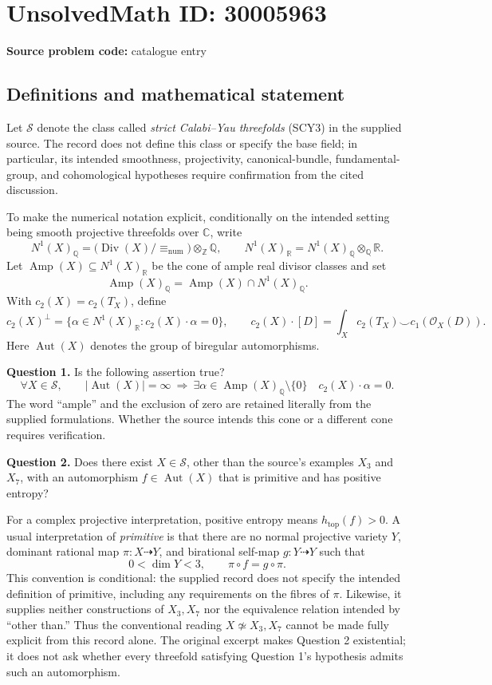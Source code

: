 \documentclass[11pt]{article}
\newcommand{\Z}{\mathbb{Z}}
\newcommand{\Q}{\mathbb{Q}}
\newcommand{\R}{\mathbb{R}}
\newcommand{\C}{\mathbb{C}}
\begin{document}
\section*{UnsolvedMath ID: 30005963}
\textbf{Source problem code:} catalogue entry
\subsection{Definitions and mathematical statement}
Let \(\mathcal S\) denote the class called \emph{strict Calabi--Yau threefolds} (SCY3) in the supplied source. The record does not define this class or specify the base field; in particular, its intended smoothness, projectivity, canonical-bundle, fundamental-group, and cohomological hypotheses require confirmation from the cited discussion.

To make the numerical notation explicit, conditionally on the intended setting being smooth projective threefolds over \(\C\), write
\[
N^1(X)_{\Q}=\bigl(\operatorname{Div}(X)/{\equiv_{\mathrm{num}}}\bigr)\otimes_{\Z}\Q,
\qquad
N^1(X)_{\R}=N^1(X)_{\Q}\otimes_{\Q}\R.
\]
Let \(\operatorname{Amp}(X)\subseteq N^1(X)_{\R}\) be the cone of ample real divisor classes and set
\[
\operatorname{Amp}(X)_{\Q}=\operatorname{Amp}(X)\cap N^1(X)_{\Q}.
\]
With \(c_2(X)=c_2(T_X)\), define
\[
c_2(X)^\perp
=\{\alpha\in N^1(X)_{\R}:c_2(X)\cdot\alpha=0\},
\qquad
c_2(X)\cdot[D]=\int_X c_2(T_X)\smile c_1(\mathcal O_X(D)).
\]
Here \(\operatorname{Aut}(X)\) denotes the group of biregular automorphisms.

\textbf{Question 1.} Is the following assertion true?
\[
\forall X\in\mathcal S,\qquad
|\operatorname{Aut}(X)|=\infty
\ \Longrightarrow\
\exists\alpha\in\operatorname{Amp}(X)_{\Q}\setminus\{0\}
\quad c_2(X)\cdot\alpha=0.
\]
The word ``ample'' and the exclusion of zero are retained literally from the supplied formulations. Whether the source intends this cone or a different cone requires verification.

\textbf{Question 2.} Does there exist \(X\in\mathcal S\), other than the source's examples \(X_3\) and \(X_7\), with an automorphism \(f\in\operatorname{Aut}(X)\) that is primitive and has positive entropy?

For a complex projective interpretation, positive entropy means \(h_{\mathrm{top}}(f)>0\). A usual interpretation of \emph{primitive} is that there are no normal projective variety \(Y\), dominant rational map \(\pi:X\dashrightarrow Y\), and birational self-map \(g:Y\dashrightarrow Y\) such that
\[
0<\dim Y<3,
\qquad
\pi\circ f=g\circ\pi.
\]
This convention is conditional: the supplied record does not specify the intended definition of primitive, including any requirements on the fibres of \(\pi\). Likewise, it supplies neither constructions of \(X_3,X_7\) nor the equivalence relation intended by ``other than.'' Thus the conventional reading \(X\not\simeq X_3,X_7\) cannot be made fully explicit from this record alone. The original excerpt makes Question 2 existential; it does not ask whether every threefold satisfying Question 1's hypothesis admits such an automorphism.
\end{document}
